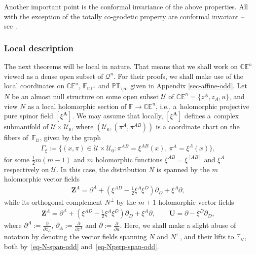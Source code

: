 \documentclass[pdftex]{sigma}
\numberwithin{equation}{section}
\newcommand{\parderv}[2] {\frac{\partial#1}{\partial#2}}
\newcommand{\mbf} [1]{\mathbf{#1}}
\newcommand{\mc} [1]{\mathcal{#1}}
\newcommand{\PT} {\mathbb{PT}}
\newcommand{\E} {\mathbb{E}}
\newcommand{\C} {\mathbb{C}}
\newcommand{\F} {\mathbb{F}}
\begin{document}
Another important point is the conformal invariance of the above properties. All with the exception of the totally co-geodetic property are conformal invariant -- see \cite{Taghavi-Chabert2013}.

\subsubsection{Local description}\label{sec-null-strc-desc}
The next theorems will be local in nature. That means that we shall work on $\C \E^n$ viewed as a dense open subset of $\mc{Q}^n$. For their proofs, we shall make use of the local coordinates on $\C \E^n$, $\F_{\C\E^n}$ and $\PT_{\setminus \widehat{\infty}}$ given in Appendix \ref{sec-affine-odd}. Let $N$ be an almost null structure on some open subset $\mc{U}$ of $\C \E^n = \{ z^A,z_A,u\}$, and view $N$ as a local holomorphic section of $\F \rightarrow \C \E^n$, i.e., a~holomorphic projective pure spinor f\/ield $[\xi^\mbf{A}]$. We may assume that locally, $[\xi^\mbf{A}]$ def\/ines a~complex submanifold of $\mc{U} \times \mc{U}_0$, where $(\mc{U}_0 , ( \pi^A , \pi^{AB} ))$ is a coordinate chart on the f\/ibers of~$\F_\mc{U}$, given by the graph
\begin{gather}\label{eq-graph-xi}
\Gamma_\xi := \big\{ (x,\pi) \in \mc{U} \times \mc{U}_0 \colon \pi^{AB} = \xi^{AB} ( x ) ,\, \pi^{A} = \xi^{A} ( x ) \big\} ,
\end{gather}
for some $\frac{1}{2}m(m-1)$ and $m$ holomorphic functions $\xi^{AB}=\xi^{[AB]}$ and $\xi^{A}$ respectively on $\mc{U}$. In this case, the distribution $N$ is spanned by the $m$ holomorphic vector f\/ields
\begin{gather}\label{eq-N-span-odd}
\bm{Z}^{A} = \partial ^{A} + \left( \xi^{AD} - \tfrac{1}{2} \xi^{A} \xi^{D} \right) \partial _{D} + \xi^{A} \partial ,
\end{gather}
while its orthogonal complement $N^\perp$ by the $m+1$ holomorphic vector f\/ields
\begin{gather}\label{eq-Nperp-span-odd}
\bm{Z}^{A} = \partial ^{A} + \left( \xi^{AD} - \tfrac{1}{2} \xi^{A} \xi^{D} \right) \partial _{D} + \xi^{A} \partial , \qquad \bm{U} = \partial - \xi^{D} \partial _{D} ,
\end{gather}
where $\partial^A := \parderv{}{z_A}$, $\partial_A := \parderv{}{z^A}$ and $\partial := \parderv{}{u}$. Here, we shall make a slight abuse of notation by denoting the vector f\/ields spanning $N$ and $N^\perp$, and their lifts to $\F_\mc{U}$, both by~\eqref{eq-N-span-odd} and~\eqref{eq-Nperp-span-odd}.
\end{document}
